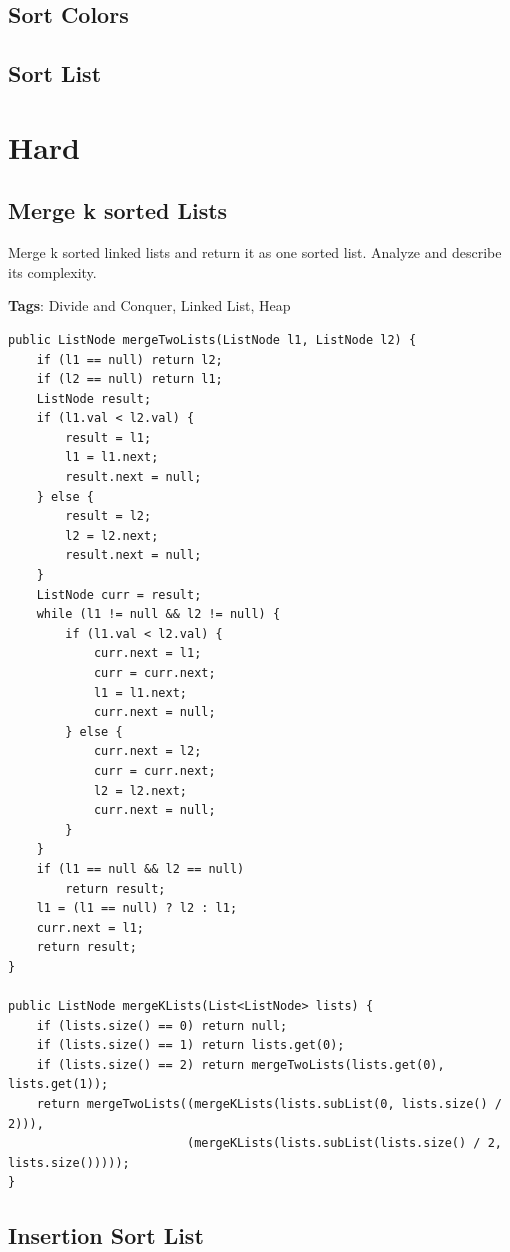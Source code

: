 \documentclass[12pt]{book}
\begin{document}
\subsection{Sort Colors}
\label{sec-7-2-1}
\subsection{Sort List}
\label{sec-7-2-2}
\section{Hard}
\label{sec-7-3}
\subsection{Merge k sorted Lists}
\label{sec-7-3-1}
Merge k sorted linked lists and return it as one sorted list. Analyze and describe its complexity.

\textbf{Tags}: Divide and Conquer, Linked List, Heap
\lstset{language=java,label= ,caption= ,numbers=none}
\begin{lstlisting}
public ListNode mergeTwoLists(ListNode l1, ListNode l2) {
    if (l1 == null) return l2;
    if (l2 == null) return l1;
    ListNode result;
    if (l1.val < l2.val) {
        result = l1;
        l1 = l1.next;
        result.next = null;
    } else {
        result = l2;
        l2 = l2.next;
        result.next = null;
    }
    ListNode curr = result;
    while (l1 != null && l2 != null) {
        if (l1.val < l2.val) {
            curr.next = l1;
            curr = curr.next;
            l1 = l1.next;
            curr.next = null;
        } else {
            curr.next = l2;
            curr = curr.next;
            l2 = l2.next;
            curr.next = null;
        }
    }
    if (l1 == null && l2 == null)
        return result;
    l1 = (l1 == null) ? l2 : l1;
    curr.next = l1;
    return result;
}

public ListNode mergeKLists(List<ListNode> lists) {
    if (lists.size() == 0) return null;
    if (lists.size() == 1) return lists.get(0);
    if (lists.size() == 2) return mergeTwoLists(lists.get(0), lists.get(1));
    return mergeTwoLists((mergeKLists(lists.subList(0, lists.size() / 2))),
                         (mergeKLists(lists.subList(lists.size() / 2, lists.size()))));
}
\end{lstlisting}

\subsection{Insertion Sort List}
\label{sec-7-3-2}
\end{document}
